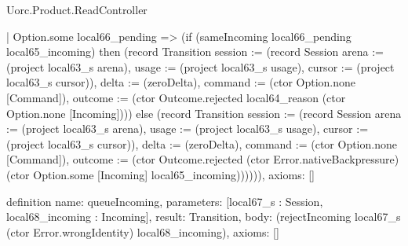 \begin{lexlean}{Uorc.Product.ReadController}
\begin{semanticmodule}
{    | Option.some local66_pending => (if (sameIncoming local66_pending local65_incoming) then (record Transition {session := (record Session {arena := (project local63_s arena), usage := (project local63_s usage), cursor := (project local63_s cursor)}), delta := (zeroDelta), command := (ctor Option.none [Command]), outcome := (ctor Outcome.rejected local64_reason (ctor Option.none [Incoming]))}) else (record Transition {session := (record Session {arena := (project local63_s arena), usage := (project local63_s usage), cursor := (project local63_s cursor)}), delta := (zeroDelta), command := (ctor Option.none [Command]), outcome := (ctor Outcome.rejected (ctor Error.nativeBackpressure) (ctor Option.some [Incoming] local65_incoming))})))),
  axioms: []
}

definition{
  name: queueIncoming,
  parameters: [local67_s : Session, local68_incoming : Incoming],
  result: Transition,
  body: (rejectIncoming local67_s (ctor Error.wrongIdentity) local68_incoming),
  axioms: []
}


\end{semanticmodule}
\end{lexlean}
